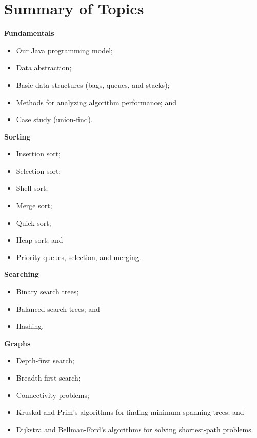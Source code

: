 \documentclass[8pt,a4paper,compress]{beamer}
\begin{document}
\section{Summary of Topics}
\begin{frame}[fragile]
\pause
\textbf{Fundamentals}
\begin{itemize}
\item Our Java programming model; 
\item Data abstraction; 
\item Basic data structures (bags, queues, and stacks);
\item Methods for analyzing algorithm performance; and
\item Case study (union-find).
\end{itemize}

\pause
\smallskip
\textbf{Sorting}
\begin{itemize}
\item Insertion sort; 
\item Selection sort;
\item Shell sort; 
\item Merge sort; 
\item Quick sort; 
\item Heap sort; and
\item Priority queues, selection, and merging.
\end{itemize}
\end{frame}

\begin{frame}[fragile]
\pause
\textbf{Searching}
\begin{itemize}
\item Binary search trees; 
\item Balanced search trees; and
\item Hashing.
\end{itemize}

\pause
\smallskip
\textbf{Graphs}
\begin{itemize}
\item Depth-first search; 
\item Breadth-first search; 
\item Connectivity problems; 
\item Kruskal and Prim's algorithms for finding minimum spanning trees; and
\item Dijkstra and Bellman-Ford's algorithms for solving shortest-path problems.
\end{itemize}
\end{frame}
\end{document}

